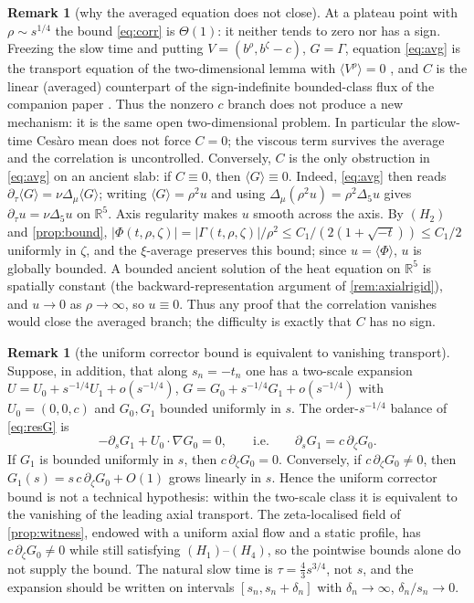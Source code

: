 \documentclass[11pt]{article}
\theoremstyle{definition}
\newtheorem{remark}[theorem]{Remark}
\newcommand{\R}{\mathbb{R}}
\newcommand{\grad}{\nabla}
\begin{document}
\begin{remark}[why the averaged equation does not close]
At a plateau point with $\rho\sim s^{1/4}$ the bound \eqref{eq:corr} is
$\Theta(1)$: it neither tends to zero nor has a sign. Freezing the slow time
and putting $V=(b^\rho,b^\zeta-c)$, $G=\Gamma$, equation \eqref{eq:avg} is
the transport equation of the two-dimensional lemma with $\langle V^\rho\rangle=0$ \cite{companion}, and
$C$ is the linear (averaged) counterpart of the sign-indefinite bounded-class
flux of the companion paper \cite{companion}. Thus the nonzero
$c$ branch does not produce a new mechanism: it is the same open
two-dimensional problem. In particular the slow-time Ces\`aro mean does not
force $C=0$; the viscous term survives the average and the correlation is
uncontrolled. Conversely, $C$ is the only obstruction in \eqref{eq:avg} on an
ancient slab: if $C\equiv0$, then $\langle G\rangle\equiv0$. Indeed, \eqref{eq:avg} then reads
$\partial_\tau\langle G\rangle=\nu\Delta_\mu\langle G\rangle$; writing
$\langle G\rangle=\rho^2u$ and using
$\Delta_\mu(\rho^2u)=\rho^2\Delta_5u$ gives
$\partial_\tau u=\nu\Delta_5u$ on $\R^5$. Axis regularity makes $u$ smooth
across the axis. By $(H_2)$ and \cref{prop:bound},
$|\Phi(t,\rho,\zeta)|=|\Gamma(t,\rho,\zeta)|/\rho^2\le
C_1/(2(1+\sqrt{-t}))\le C_1/2$ uniformly in $\zeta$, and the $\xi$-average
preserves this bound; since $u=\langle\Phi\rangle$, $u$ is globally bounded. A bounded
ancient solution of the heat equation on $\R^5$ is spatially constant (the
backward-representation argument of \cref{rem:axialrigid}), and
$u\to0$ as $\rho\to\infty$, so $u\equiv0$. Thus any proof that the correlation
vanishes would close the averaged branch; the difficulty is exactly that $C$
has no sign.
\end{remark}

\begin{remark}[the uniform corrector bound is equivalent to vanishing transport]
\label{rem:corrector}
Suppose, in addition, that along $s_n=-t_n$ one has a two-scale expansion
$U=U_0+s^{-1/4}U_1+o(s^{-1/4})$,
$G=G_0+s^{-1/4}G_1+o(s^{-1/4})$ with $U_0=(0,0,c)$ and $G_0,G_1$ bounded
uniformly in $s$. The order-$s^{-1/4}$ balance of \eqref{eq:resG} is
\begin{equation}\label{eq:order14}
-\partial_sG_1+U_0\cdot\grad G_0=0,
\qquad\text{i.e.}\qquad
\partial_sG_1=c\,\partial_\zeta G_0 .
\end{equation}
If $G_1$ is bounded uniformly in $s$, then $c\,\partial_\zeta G_0=0$.
Conversely, if $c\,\partial_\zeta G_0\ne0$, then
$G_1(s)=s\,c\,\partial_\zeta G_0+O(1)$ grows linearly in $s$. Hence the
uniform corrector bound is not a technical hypothesis: within the two-scale
class it is equivalent to the vanishing of the leading axial transport. The
zeta-localised field of \cref{prop:witness}, endowed with a uniform axial flow
and a static profile, has $c\,\partial_\zeta G_0\ne0$ while still satisfying
$(H_1)$--$(H_4)$, so the pointwise bounds alone do not supply the bound. The
natural slow
time is $\tau=\tfrac43s^{3/4}$, not $s$, and the expansion should be written
on intervals $[s_n,s_n+\delta_n]$ with $\delta_n\to\infty$,
$\delta_n/s_n\to0$.
\end{remark}
\end{document}
